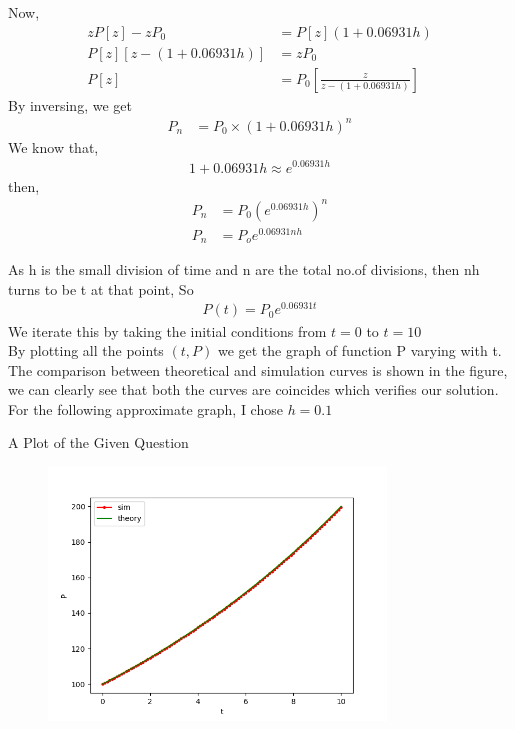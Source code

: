 \documentclass{beamer}
\providecommand{\sbrak}[1]{\ensuremath{{}\left[#1\right]}}
\providecommand{\brak}[1]{\ensuremath{\left(#1\right)}}
\theoremstyle{remark}
\numberwithin{equation}{section}
\begin{document}
\begin{frame}
    Now,
        \begin{align}
            zP\sbrak{z}-zP_0 &= P\sbrak{z}(1+0.06931h) \\
            P\sbrak{z} \sbrak{z-\brak{1+0.06931h}} &= zP_0 \\
            P\sbrak{z} &= P_0 \sbrak{\frac{z}{z-\brak{1+0.06931h}}}
        \end{align}
    By inversing, we get 
        \begin{align}
            P_n &= P_0 \times \brak{1+0.06931h}^n
        \end{align}
    We know that,
        \begin{align}
            1+0.06931h \approx e^{0.06931h}
        \end{align}
    then,
        \begin{align}
            P_n &= P_0 \brak{e^{0.06931h}}^n \\
            P_n &= P_o e^{0.06931nh}
        \end{align}
        \end{frame}

\begin{frame}
        As h is the small division of time and n are the total no.of divisions, then nh turns to be t at that point, So
        \begin{align}
            P\brak{t}=P_0e^{0.06931t}
        \end{align}
        We iterate this by taking the initial conditions from $t = 0$ to $t = 10$\\
By plotting all the points \brak{t,P} we get the graph of function P varying with t.\\
The comparison between theoretical and simulation curves is shown in the figure, we can clearly see that both the curves are coincides which verifies our solution.\\
For the following approximate graph, I chose $h = 0.1$
\end{frame}

\begin{frame}{A Plot of the Given Question}
\begin{figure}[ht]
  \centering
  \includegraphics[width=0.8\textwidth]{figs/fig.png} %
\end{figure}
\end{frame}
\end{document}
